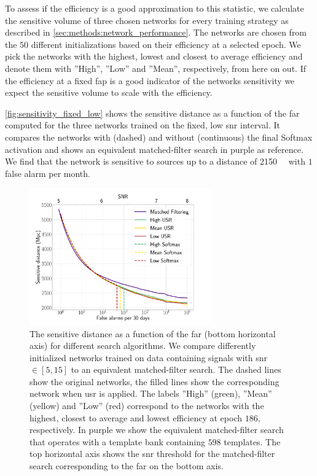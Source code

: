 To assess if the efficiency is a good approximation to this statistic, we calculate the sensitive volume of three chosen networks for every training strategy as described in \autoref{sec:methods:network_performance}. The networks are chosen from the $50$ different initializations based on their efficiency at a selected epoch. We pick the networks with the highest, lowest and closest to average efficiency and denote them with ''High'', ''Low'' and ''Mean'', respectively, from here on out. If the efficiency at a fixed \acrshort{fap} is a good indicator of the networks sensitivity we expect the sensitive volume to scale with the efficiency.

\autoref{fig:sensitivity_fixed_low} shows the sensitive distance as a function of the \acrshort{far} computed for the three networks trained on the fixed, low \acrshort{snr} interval. It compares the networks with (dashed) and without (continuous) the final Softmax activation and shows an equivalent matched-filter search in purple as reference. We find that the network is sensitive to sources up to a distance of \SI{2150}{\mega\parsec} with $1$ false alarm per month.

\begin{figure}
    \centering
    \includegraphics[width=0.7\textwidth]{chapters/training_strats/images/fixed_low_sens.pdf}
    \caption[Sensitive distance plot]{The sensitive distance as a function of the \acrshort{far} (bottom horizontal axis) for different search algorithms. We compare differently initialized networks trained on data containing signals with \acrshort{snr} $\in\left[5,15\right]$ to an equivalent matched-filter search. The dashed lines show the original networks, the filled lines show the corresponding network when \acrshort{usr} is applied. The labels ''High'' (green), ''Mean'' (yellow) and ''Low'' (red) correspond to the networks with the highest, closest to average and lowest efficiency at epoch $186$, respectively. In purple we show the equivalent matched-filter search that operates with a template bank containing $598$ templates. The top horizontal axis shows the \acrshort{snr} threshold for the matched-filter search corresponding to the \acrshort{far} on the bottom axis.}
    \label{fig:sensitivity_fixed_low}
\end{figure}

